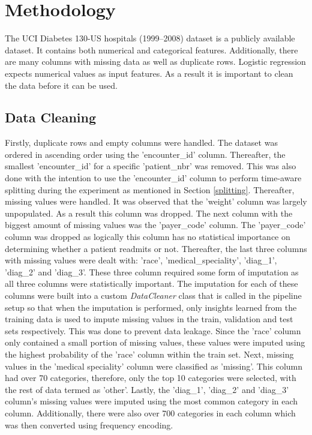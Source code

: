\section{Methodology}\label{methodology}

The UCI Diabetes 130-US hospitals (1999–2008) dataset is a publicly available dataset. It contains both numerical and categorical features. Additionally, 
there are many columns with missing data as well as duplicate rows. Logistic regression expects numerical values as input features. As a result it 
is important to clean the data before it can be used.

\subsection{Data Cleaning}\label{data_cleaning}

Firstly, duplicate rows and empty columns were handled. The dataset was ordered in ascending order using the 'encounter\_id' column. Thereafter, the smallest 'encounter\_id' for a specific 'patient\_nbr'
was removed. This was also done with the intention to use the 'encounter\_id' column to perform time-aware splitting during the experiment as mentioned in Section \ref{splitting}. Thereafter, missing values were handled. 
It was observed that the 'weight' column was largely unpopulated. As a result this column was dropped. The next column with the biggest amount of missing values was the
'payer\_code' column. The 'payer\_code' column was dropped as logically this column has no statistical importance on determining whether a patient readmits or not.
Thereafter, the last three columns with missing values were dealt with: 'race', 'medical\_speciality', 'diag\_1', 'diag\_2' and 'diag\_3'. These three column required some form of
imputation as all three columns were statistically important. The imputation for each of these columns were built into a custom \emph{DataCleaner} class that is called in the pipeline setup
so that when the imputation is performed, only insights learned from the training data is used to impute missing values in the train, validation and test sets respectively. This was done to prevent data 
leakage. Since the 'race' column only contained a small portion of missing values, these values were imputed using the highest probability of the 'race' column within the train set. 
Next, missing values in the 'medical speciality' column were classified as 'missing'. This column had over 70 categories, therefore, only the top 10 categories were selected, with the 
rest of data termed as 'other'. Lastly, the 'diag\_1', 'diag\_2' and 'diag\_3' column's missing values were imputed using the most common category in each column. Additionally, there were also
over 700 categories in each column which was then converted using frequency encoding.

